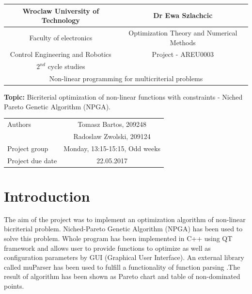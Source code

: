 \documentclass[a4paper, 11pt]{article}
\begin{document}
\renewcommand*\contentsname{Table of contents}
	\begin{center}
		\begin{tabular}{| c | c |}
		\hline
		Wroclaw University of Technology & Dr Ewa Szlachcic\\ \hline
		Faculty of electronics & Optimization Theory and
		Numerical Methods \\
		Control Engineering and Robotics & Project - AREU0003\\
		$2^{nd}$ cycle studies & \\ \hline
		\multicolumn{2}{c}{Non-linear programming for multicriterial problems}\\
			\hline
	\end{tabular}			
	\end{center}
	
	\textbf{Topic:} Bicriterial optimization of non-linear functions with constraints - Niched Pareto Genetic Algorithm (NPGA).
	
	\begin{center}
		\begin{tabular}{| l | c |}
		\hline
		Authors & Tomasz Bartos, 209248\\
				& Radoslaw Zwolski, 209124\\ \hline
		Project group & Monday, 13:15-15:15, Odd weeks\\ \hline
		Project due date & 22.05.2017\\
		\hline
	\end{tabular}
	\end{center}
	
	\newpage
	
	\tableofcontents
	
	\newpage

	\section{Introduction}
	
	The aim of the project was to implement an optimization algorithm of non-linear
	bicriterial problem. Niched-Pareto Genetic Algorithm (NPGA) \cite{OptymailzacjaWielokryterialna} has been used to
	solve this problem. Whole program has been implemented in C++ using QT 	
	framework \cite{Qt} and allows user to provide functions to optimize as well 
	as configuration parameters by GUI (Graphical User Interface). An external
	library called muParser \cite{MuParser} has been used to fulfill a functionality of
	function parsing .The result of algorithm has been shown as Pareto chart and
	table of non-dominated points.
	
\end{document}
